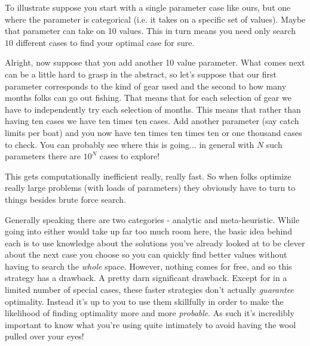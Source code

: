 \documentclass[11pt,a5paper]{book}
\begin{document}
To illustrate suppose you start with a single parameter case like ours, but one where the parameter is categorical (i.e. it takes on a specific set of values). Maybe that parameter can take on 10 values. This in turn means you need only search $10$ different cases to find your optimal case for sure. 
\newline

Alright, now suppose that you add another 10 value parameter. What comes next can be a little hard to grasp in the abstract, so let's suppose that our first parameter corresponds to the kind of gear used and the second to how many months folks can go out fishing. That means that for each selection of gear we have to independently try each selection of months. This means that rather than having ten cases we have ten times ten cases. Add another parameter (say catch limits per boat) and you now have ten times ten times ten or one thousand cases to check. You can probably see where this is going... in general with $N$ such parameters there are $10^N$ cases to explore!
\newline

This gets computationally inefficient really, really fast. So when folks optimize really large problems (with loads of parameters) they obviously have to turn to things besides brute force search.
\newline

Generally speaking there are two categories - analytic and meta-heuristic. While going into either would take up far too much room here, the basic idea behind each is to use knowledge about the solutions you've already looked at to be clever about the next case you choose so you can quickly find better values without having to search the \textit{whole} space. However, nothing comes for free, and so this strategy has a drawback. A pretty darn significant drawback. Except for in a limited number of special cases, these faster strategies don't actually \textit{guarantee} optimality. Instead it's up to you to use them skillfully in order to make the likelihood of finding optimality more and more \textit{probable}. As such it's incredibly important to know what you're using quite intimately to avoid having the wool pulled over your eyes!
\newpage
\end{document}
